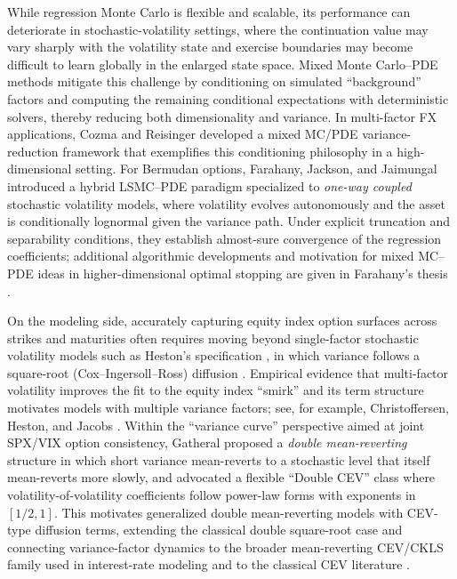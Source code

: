 \documentclass[10pt]{article}
\theoremstyle{plain}
\theoremstyle{definition}
\theoremstyle{remark}
\begin{document}
While regression Monte Carlo is flexible and scalable, its performance can deteriorate in
stochastic-volatility settings, where the continuation value may vary sharply with the volatility
state and exercise boundaries may become difficult to learn globally in the enlarged state space.
Mixed Monte Carlo--PDE methods mitigate this challenge by conditioning on simulated
``background'' factors and computing the remaining conditional expectations with deterministic
solvers, thereby reducing both dimensionality and variance. In multi-factor FX applications,
Cozma and Reisinger \citep{cozma2017mixed} developed a mixed MC/PDE variance-reduction framework
that exemplifies this conditioning philosophy in a high-dimensional setting. For Bermudan
options, Farahany, Jackson, and Jaimungal \citep{farahany2020mixing} introduced a hybrid
LSMC--PDE paradigm specialized to \emph{one-way coupled} stochastic volatility models, where
volatility evolves autonomously and the asset is conditionally lognormal given the variance path.
Under explicit truncation and separability conditions, they establish almost-sure convergence of
the regression coefficients; additional algorithmic developments and motivation for mixed
MC--PDE ideas in higher-dimensional optimal stopping are given in Farahany's thesis
\citep{farahany2019thesis}. 

On the modeling side, accurately capturing equity index option surfaces across strikes and
maturities often requires moving beyond single-factor stochastic volatility models such as
Heston's specification \citep{heston1993closedform}, in which variance follows a square-root
(Cox--Ingersoll--Ross) diffusion \citep{cir1985termstructure}. Empirical evidence that multi-factor
volatility improves the fit to the equity index ``smirk'' and its term structure motivates models
with multiple variance factors; see, for example, Christoffersen, Heston, and Jacobs
\citep{christoffersen2009smirk}. Within the ``variance curve'' perspective aimed at joint SPX/VIX
option consistency, Gatheral proposed a \emph{double mean-reverting} structure in which short
variance mean-reverts to a stochastic level that itself mean-reverts more slowly, and advocated
a flexible ``Double CEV'' class where volatility-of-volatility coefficients follow power-law forms
with exponents in $[1/2,1]$. This motivates generalized
double mean-reverting models with CEV-type diffusion terms, extending the classical double
square-root case and connecting variance-factor dynamics to the broader mean-reverting CEV/CKLS
family used in interest-rate modeling \citep{chan1992empirical} and to the classical CEV
literature \citep{cox1975cev}.
\end{document}
